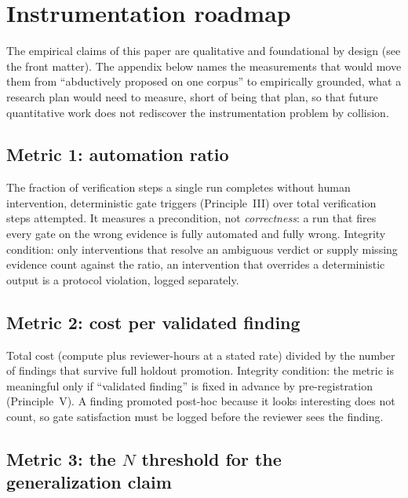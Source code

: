 \documentclass[
  11pt,
]{article}
\begin{document}
\section{Instrumentation roadmap}\label{instrumentation-roadmap}

The empirical claims of this paper are qualitative and foundational by
design (see the front matter). The appendix below names the measurements
that would move them from ``abductively proposed on one corpus'' to
empirically grounded, what a research plan would need to measure,
short of being that plan, so that future quantitative work does not
rediscover the instrumentation problem by collision.

\subsection{Metric 1: automation ratio}\label{metric-1-automation-ratio}

The fraction of verification steps a single run completes without human
intervention, deterministic gate triggers (Principle~III) over total
verification steps attempted. It measures a precondition, not
\emph{correctness}: a run that fires every gate on the wrong evidence is
fully automated and fully wrong. Integrity condition: only interventions
that resolve an ambiguous verdict or supply missing evidence count
against the ratio, an intervention that overrides a deterministic output
is a protocol violation, logged separately.

\subsection{Metric 2: cost per validated
finding}\label{metric-2-cost-per-validated-finding}

Total cost (compute plus reviewer-hours at a stated rate) divided by the
number of findings that survive full holdout promotion. Integrity
condition: the metric is meaningful only if ``validated finding'' is
fixed in advance by pre-registration (Principle~V). A finding promoted
post-hoc because it looks interesting does not count, so gate
satisfaction must be logged before the reviewer sees the finding.

\subsection{\texorpdfstring{Metric 3: the \(N\) threshold for the
generalization
claim}{Metric 3: the N threshold for the generalization claim}}\label{metric-3-the-n-threshold-for-the-generalization-claim}
\end{document}
